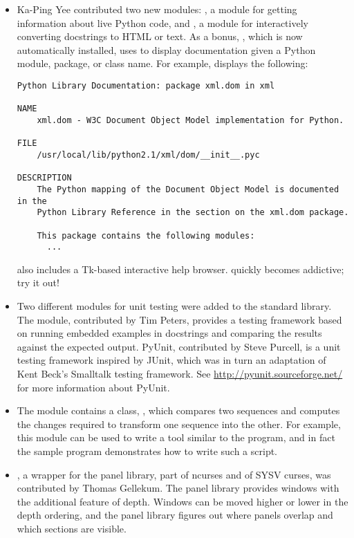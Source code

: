 \documentclass{howto}
\begin{document}
\begin{itemize}

\item Ka-Ping Yee contributed two new modules: , a
module for getting information about live Python code, and
, a module for interactively converting docstrings to
HTML or text.  As a bonus, , which is now
automatically installed, uses  to display
documentation given a Python module, package, or class name.  For
example,  displays the following:

\begin{verbatim}
Python Library Documentation: package xml.dom in xml
 
NAME
    xml.dom - W3C Document Object Model implementation for Python.
 
FILE
    /usr/local/lib/python2.1/xml/dom/__init__.pyc
 
DESCRIPTION
    The Python mapping of the Document Object Model is documented in the
    Python Library Reference in the section on the xml.dom package.
 
    This package contains the following modules:
      ...
\end{verbatim}

 also includes a Tk-based interactive help browser.  
 quickly becomes addictive; try it out!

\item Two different modules for unit testing were added to the
standard library.  The  module, contributed by Tim
Peters, provides a testing framework based on running embedded
examples in docstrings and comparing the results against the expected
output.  PyUnit, contributed by Steve Purcell, is a unit testing
framework inspired by JUnit, which was in turn an adaptation of Kent
Beck's Smalltalk testing framework.  See
\url{http://pyunit.sourceforge.net/} for more information about
PyUnit.

\item The  module contains a class,
, which compares two sequences and computes the
changes required to transform one sequence into the other.  For
example, this module can be used to write a tool similar to the \UNIX{}
 program, and in fact the sample program
 demonstrates how to write such a script.  

\item {}, a wrapper for the panel library, part of
ncurses and of SYSV curses, was contributed by Thomas Gellekum.  The
panel library provides windows with the additional feature of depth.
Windows can be moved higher or lower in the depth ordering, and the
panel library figures out where panels overlap and which sections are
visible.


\end{itemize}
\end{document}
